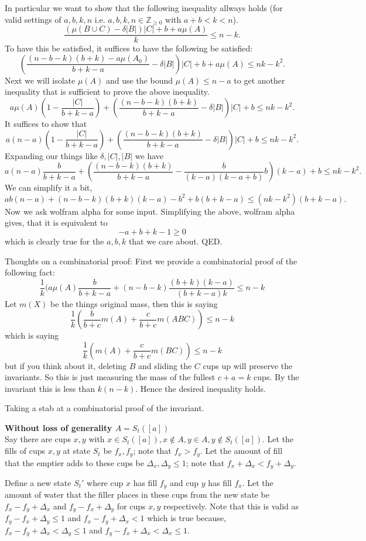 \documentclass[twocolumn]{article}[11pt]
\begin{document}
In particular we want to show that the following inequality allways holds (for valid settings of $a,b,k,n$ i.e. $a,b,k,n \in \mathbb{Z}_{\ge0}$ with $a+b<k<n$).
$$\frac{(\mu(B\cup C) -\delta|B|)|C| + b + a\mu(A)}{k} \le n-k.$$
To have this be satisfied, it suffices to have the following be satisfied:
$$ \left(\frac{(n-b-k)(b+k) - a\mu(A_0)}{b+k-a} - \delta|B|\right)|C| + b + a \mu(A) \le nk - k^2.$$
Next we will isolate $\mu(A)$ and use the bound $\mu(A) \le n-a$ to get another inequality that is sufficient to prove the above inequality.
$$ a\mu(A) \left( 1-\frac{|C|}{b+k-a} \right) + \left(\frac{(n-b-k)(b+k)}{b+k-a}-\delta|B|\right)|C| + b\le nk-k^2.$$
It suffices to show that
$$ a(n-a) \left( 1-\frac{|C|}{b+k-a} \right) + \left(\frac{(n-b-k)(b+k)}{b+k-a}-\delta|B|\right)|C| + b\le nk-k^2.$$
Expanding our things like $\delta, |C|, |B|$ we have
$$ a(n-a) \frac{b}{b+k-a} + \left(\frac{(n-b-k)(b+k)}{b+k-a}-\frac{b}{(k-a)(k-a+b)} b\right)(k-a) + b\le nk-k^2.$$
We can simplify it a bit,
$$ ab(n-a) + (n-b-k)(b+k)(k-a)- b^2 + b(b+k-a)  \le (nk-k^2)(b+k-a).$$
Now we ask wolfram alpha for some input. Simplifying the above, wolfram alpha gives, that it is equivalent to 
$$-a+b+k-1\ge 0$$ 
which is clearly true for the $a,b,k$ that we care about. QED.

Thoughts on a combinatorial proof:
First we provide a combinatorial proof of the following fact:
$$\frac{1}{k}(a\mu(A)\frac{b}{b+k-a} + (n-b-k)\frac{(b+k)(k-a)}{(b+k-a)k} \le n-k$$
Let $m(X)$ be the things original mass, then this is saying
$$\frac{1}{k}(\frac{b}{b+c} m(A) + \frac{c}{b+c} m(ABC)) \le n-k$$
which is saying
$$\frac{1}{k}(m(A) + \frac{c}{b+c} m(BC)) \le n-k$$
but if you think about it, deleting $B$ and sliding the $C$ cups up will preserve the invariants. So this is just measuring the mass of the fullest $c+a = k$ cups. By the invariant this is less than $k(n-k)$.
Hence the desired inequality holds.

Taking a stab at a combinatorial proof of the invariant.





\textbf{Without loss of generality $A = S_t([a])$}\\
Say there are cups $x, y$ with $x\in S_t([a]), x\not\in A, y \in A, y \not\in S_t([a])$.
Let the fills of cups $x,y$ at state $S_t$ be $f_x, f_y$; note that $f_x > f_y$. Let the amount of fill that the
emptier adds to these cups be $\Delta_x, \Delta_y \le 1$; note that $f_x +\Delta_x < f_y + \Delta_y$.

Define a new state $S_t'$ where cup $x$ has fill $f_y$ and cup $y$ has fill $f_x$. 
Let the amount of water that the filler places in these cups from the new state be
$f_x-f_y+\Delta_x$ and $f_y-f_x + \Delta_y$ for cups $x,y$ respectively.
Note that this is valid as $f_y-f_x + \Delta_y\le 1$ and $f_x-f_y+\Delta_x < 1$
which is true because, $f_x-f_y+\Delta_x<\Delta_y \le 1$ and $f_y-f_x + \Delta_x < \Delta_x \le 1$.
\end{document}
